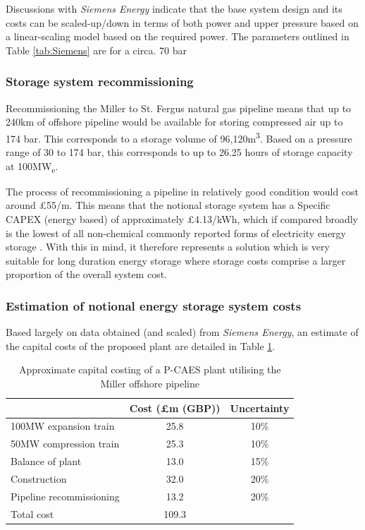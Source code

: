 \documentclass[preprint,12pt]{elsarticle}
\begin{document}
Discussions with \textit{Siemens Energy} indicate that the base system design and its costs can be scaled-up/down in terms of both power and upper pressure based on a linear-scaling model based on the required power. The parameters outlined in Table \ref{tab:Siemens} are for a circa. 70 bar

\subsubsection{Storage system recommissioning}

Recommissioning the Miller to St. Fergus natural gas pipeline means that up to 240km of offshore pipeline would be available for storing compressed air up to 174 bar. This corresponds to a storage volume of 96,120m\textsuperscript{3}. Based on a pressure range of 30 to 174 bar, this corresponds to up to 26.25 hours of storage capacity at 100MW\textsubscript{e}. 

The process of recommissioning a pipeline in relatively good condition would cost around £55/m. This means that the notional storage system has a Specific CAPEX (energy based) of approximately £4.13/kWh, which if compared broadly is the lowest of all non-chemical commonly reported forms of electricity energy storage \cite{Julch2015}. With this in mind, it therefore represents a solution which is very suitable for long duration energy storage where storage costs comprise a larger proportion of the overall system cost.   

\subsubsection{Estimation of notional energy storage system costs}

Based largely on data obtained (and scaled) from \textit{Siemens Energy}, an estimate of the capital costs of the proposed plant are detailed in Table \ref{tab:NotionalSystemCosts}.

\begin{table}[h]
    \centering
    \begin{tabular}{lcc}
\hline
 & Cost (£m (GBP)) & Uncertainty\\
 \hline
100MW expansion train  & 25.8 & 10\%\\
50MW compression train & 25.3 & 10\%\\
Balance of plant & 13.0 & 15\%\\
Construction & 32.0 & 20\%\\
Pipeline recommissioning & 13.2 & 20\%\\
\hline
Total cost & 109.3 & \\
\hline
\end{tabular}
    \caption{Approximate capital costing of a P-CAES plant utilising the Miller offshore pipeline}
    \label{tab:NotionalSystemCosts}
\end{table}
\end{document}
